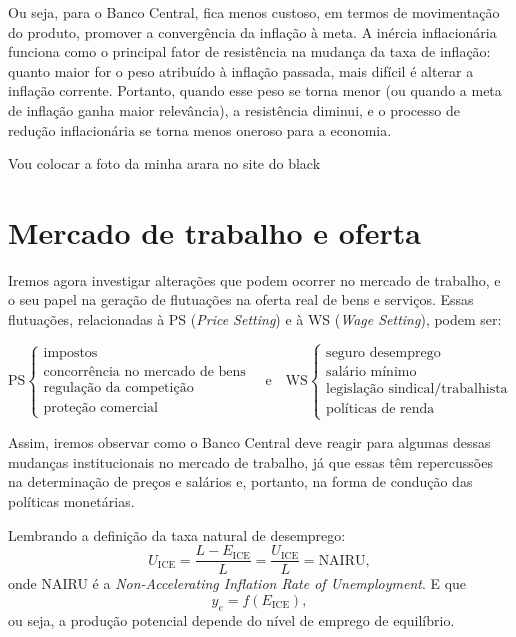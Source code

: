 \documentclass[a4paper,12pt]{article}[abntex2]
\begin{document}
Ou seja, para o Banco Central, fica menos custoso, em termos de movimentação do produto, promover a convergência da inflação à meta. A inércia inflacionária funciona como o principal fator de resistência na mudança da taxa de inflação: quanto maior for o peso atribuído à inflação passada, mais difícil é alterar a inflação corrente. Portanto, quando esse peso se torna menor (ou quando a meta de inflação ganha maior relevância), a resistência diminui, e o processo de redução inflacionária se torna menos oneroso para a economia.

Vou colocar a foto da minha arara no site do black

 \newpage
\section{\textbf{Mercado de trabalho e oferta}}

Iremos agora investigar alterações que podem ocorrer no mercado de trabalho, e o seu papel na geração de flutuações na oferta real de bens e serviços. Essas flutuações, relacionadas à PS (\emph{Price Setting}) e à WS (\emph{Wage Setting}), podem ser:

\[
\text{PS} \begin{cases}
\text{impostos} \\
\text{concorrência no mercado de bens} \\
\text{regulação da competição} \\
\text{proteção comercial}
\end{cases}
\quad\text{e}\quad
\text{WS} \begin{cases}
\text{seguro desemprego} \\
\text{salário mínimo} \\
\text{legislação sindical/trabalhista} \\
\text{políticas de renda}
\end{cases}
\]

Assim, iremos observar como o Banco Central deve reagir para algumas dessas mudanças institucionais no mercado de trabalho, já que essas têm repercussões na determinação de preços e salários e, portanto, na forma de condução das políticas monetárias.

Lembrando a definição da taxa natural de desemprego:
\[
U_{\text{ICE}} 
= \frac{L - E_{\text{ICE}}}{L} 
= \frac{U_{\text{ICE}}}{L} 
= \text{NAIRU},
\]
onde NAIRU é a \emph{Non-Accelerating Inflation Rate of Unemployment}. E que
\[
y_e = f(E_{\text{ICE}}),
\]
ou seja, a produção potencial depende do nível de emprego de equilíbrio.
\end{document}
